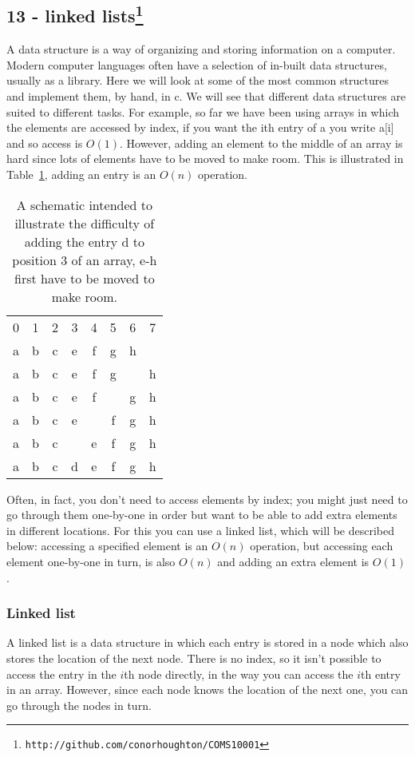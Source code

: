 \documentclass[11pt,a4paper]{scrartcl}
\begin{document}
\subsection*{13 - linked lists\footnote{\texttt{http://github.com/conorhoughton/COMS10001}}}

A data structure is a way of organizing and storing information on a
computer. Modern computer languages often have a selection of in-built
data structures, usually as a library. Here we will look at some of
the most common structures and implement them, by hand, in c. We will
see that different data structures are suited to different tasks. For
example, so far we have been using arrays in which the elements are
accessed by index, if you want the ith entry of a you write a[i] and
so access is $O(1)$. However, adding an element to the middle of an
array is hard since lots of elements have to be moved to make
room. This is illustrated in Table~\ref{table_reindexing}, adding an
entry is an $O(n)$ operation.

\begin{table}[b]
\begin{tabular}{cccc cccc}
0&1&2&3&4&5&6&7\\
a&b&c&e&f&g&h&\\
a&b&c&e&f&g&&h\\
a&b&c&e&f&&g&h\\
a&b&c&e&&f&g&h\\
a&b&c&&e&f&g&h\\
a&b&c&d&e&f&g&h
\end{tabular}
\caption{A schematic intended to illustrate the difficulty of adding the entry d to position 3 of an array, e-h first have to be moved to make room.\label{table_reindexing}}
\end{table}

Often, in fact, you don't need to access elements by index; you might
just need to go through them one-by-one in order but want to be able
to add extra elements in different locations. For this you can use a
linked list, which will be described below: accessing a specified
element is an $O(n)$ operation, but accessing each element one-by-one
in turn, is also $O(n)$ and adding an extra element is $O(1)$.

\subsubsection*{Linked list}

A linked list is a data structure in which each entry is stored in a
node which also stores the location of the next node. There is no
index, so it isn't possible to access the entry in the $i$th node
directly, in the way you can access the $i$th entry in an
array. However, since each node knows the location of the next one,
you can go through the nodes in turn.
\end{document}
